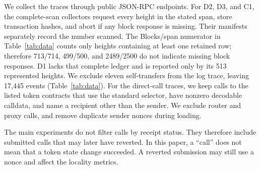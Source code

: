 \documentclass[conference,letterpaper]{IEEEtran}
\begin{document}
\begin{table}[t]
\caption{Measured traces. Blocks/span counts heights with at least one retained
row over the requested inclusive span, not scan completeness. D2, D3, and C1
scanned every requested block; D1 has no complete scanned-block ledger.
Top token is the share of the most frequent contract; Multi-tok. is the share
of calls/events from repeat senders active in multiple tokens.}
\label{tab:data}
\centering
\small
{}
\end{table}

We collect the traces through public JSON-RPC endpoints. For D2, D3, and C1,
the complete-scan collectors request every height in the stated span, store
transaction hashes, and abort if any block response is missing. Their manifests
separately record the number scanned. The Blocks/span numerator in
Table~\ref{tab:data} counts only heights containing at least one retained row;
therefore 713/714, 499/500, and 2489/2500 do not indicate missing block
responses. D1 lacks that complete ledger and is reported only by its 513
represented heights. We exclude eleven self-transfers from the log trace,
leaving 17,445 events (Table~\ref{tab:data}). For the direct-call traces, we
keep calls to the listed token contracts that use the standard selector, have
nonzero decodable calldata, and name a recipient other than the sender. We
exclude router and proxy calls, and remove duplicate sender nonces during
loading.

The main experiments do not filter calls by receipt status. They therefore
include submitted calls that may later have reverted. In this paper, a
``call'' does not mean that a token state change succeeded. A reverted
submission may still use a nonce and affect the locality metrics.
\end{document}

